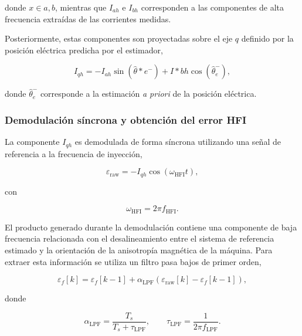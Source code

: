 donde $x\in{a,b}$, mientras que $I_{ah}$ e $I_{bh}$ corresponden a las componentes de alta frecuencia extraídas de las corrientes medidas.

Posteriormente, estas componentes son proyectadas sobre el eje $q$ definido por la posición eléctrica predicha por el estimador,

\begin{equation}
I_{qh}
=
-I_{ah}\sin\left(\hat{\theta}*{e}^{-}\right)
+
I*{bh}\cos\left(\hat{\theta}_{e}^{-}\right),
\label{eq:iqh_hfi}
\end{equation}

donde $\hat{\theta}_{e}^{-}$ corresponde a la estimación \textit{a priori} de la posición eléctrica.

\subsubsection{Demodulación síncrona y obtención del error HFI}
\label{subsubsec:demodulacion_hfi}

La componente $I_{qh}$ es demodulada de forma síncrona utilizando una señal de referencia a la frecuencia de inyección,

\begin{equation}
\varepsilon_{\mathrm{raw}}
=
-I_{qh}
\cos\left(\omega_{\mathrm{HFI}}t\right),
\label{eq:demod_hfi}
\end{equation}

con

\begin{equation}
\omega_{\mathrm{HFI}}
=
2\pi f_{\mathrm{HFI}}.
\end{equation}

El producto generado durante la demodulación contiene una componente de baja frecuencia relacionada con el desalineamiento entre el sistema de referencia estimado y la orientación de la anisotropía magnética de la máquina. Para extraer esta información se utiliza un filtro pasa bajos de primer orden,

\begin{equation}
\varepsilon_f[k]
=
\varepsilon_f[k-1]
+
\alpha_{\mathrm{LPF}}
\left(
\varepsilon_{\mathrm{raw}}[k]
-
\varepsilon_f[k-1]
\right),
\label{eq:lpf_hfi}
\end{equation}

donde

\begin{equation}
\alpha_{\mathrm{LPF}}
=
\frac{T_s}
{T_s+\tau_{\mathrm{LPF}}},
\qquad
\tau_{\mathrm{LPF}}
=
\frac{1}{2\pi f_{\mathrm{LPF}}}.
\end{equation}

